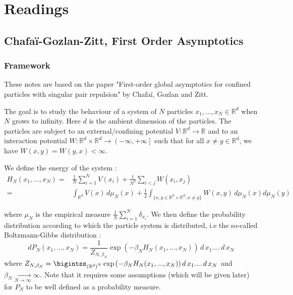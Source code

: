 \documentclass[a4paper,12pt]{report}
\begin{document}
\chapter{Readings}

\section{Chafa\"i-Gozlan-Zitt, First Order Asymptotics}\label{Chafai-Gozlan-Zitt}

\subsection{Framework}

These notes are based on the paper "First-order global asymptotics for confined particles with singular pair repulsion" by Chafaï, Gozlan and Zitt. \cite{chafai-gozlan-zitt}

The goal is to study the behaviour of a system of $N$ particles $x_1, ..., x_N \in \mathbb{R}^{d}$ when $N$ grows to infinity. Here $d$ is the ambient dimension of the particles. The particles are subject to an external/confining potential $V : \mathbb{R}^{d} \longrightarrow \mathbb{R}$ and to an interaction potential $W : \mathbb{R}^{d} \times \mathbb{R}^{d} \longrightarrow \left(-\infty, +\infty\right]$ such that for all $x \neq y \in \mathbb{R}^{d}$, we have $W(x, y) = W(y, x) < \infty$.

We define the energy of the system :
\begin{align*}
    H_{N}\left(x_1, ..., x_N\right) =& \frac{1}{N}\sum\limits_{i =1}^{N} V(x_i) + \frac{1}{N^2}\sum\limits_{i < j} W(x_i, x_j)\\
    =& \int_{\mathbb{R}^{d}} V(x) \,d\mu_{N}(x) + \frac{1}{2} \int_{\{x, y \in \mathbb{R}^{d}\times \mathbb{R}^{d} : x \neq y\}} W(x, y)\, d\mu_{N}(x) d\mu_{N}(y) 
\end{align*}

where $\mu_{N}$ is the empirical measure $\frac{1}{N}\sum\limits_{i=1}^{N} \delta_{x_i}$. We then define the probability distribution according to which the particle system is distributed, i.e the so-called Boltzmann-Gibbs distribution :
\[dP_{N}(x_1, ..., x_N) = \frac{1}{Z_{N, \beta_{N}}} \exp{\left(-\beta_{N} H_{N}(x_1, ..., x_N)\right)}\,d\,x_{1}....\,d\,x_{N}\]
where $Z_{N, \beta_{N}} = \bigintss_{\left(\mathbb{R}^{d}\right)^{N}} \exp{\left(-\beta_{N} H_{N}(x_1, ..., x_N)\right)}\,d\,x_{1}....\,d\,x_{N}$ and $\beta_{N} \underset{N \longrightarrow \infty}{\longrightarrow} \infty$. Note that it requires some assumptions (which will be given later) for $P_{N}$ to be well defined as a probability measure.
\vspace{0.5cm}
\end{document}
